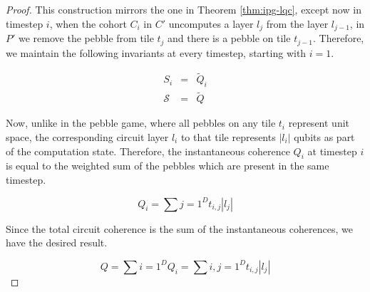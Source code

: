 \begin{proof}
This construction mirrors the one in Theorem \ref{thm:ipg-lqc},
except now in timestep $i$, when the cohort $C_i$ in $C'$ uncomputes a layer $l_j$
from the layer $l_{j-1}$, in $P'$ we remove the pebble from tile $t_j$
and there is a pebble on tile $t_{j-1}$. Therefore, we maintain the
following invariants at every timestep, starting with $i=1$.

\begin{eqnarray}
        S_i & = & \tilde{Q}_i \\
\mathcal{S} & = & \tilde{Q}
\end{eqnarray}

Now, unlike in the pebble game, where all pebbles on any tile $t_i$
represent unit space, the corresponding circuit layer $l_i$ to that tile
represents $|l_i|$ qubits as part of the computation state. Therefore,
the instantaneous coherence $Q_i$ at timestep $i$ is equal to the
weighted sum of the pebbles which are present in the same timestep.

\begin{equation}
Q_i = \sum{j=1}^{D} t_{i,j} |l_j|
\end{equation}

Since the total circuit coherence is the sum of the instantaneous coherences,
we have the desired result.

\begin{equation}
Q = \sum{i=1}^D Q_i = \sum{i,j=1}^D t_{i,j} |l_j| 
\end{equation}
\end{proof}